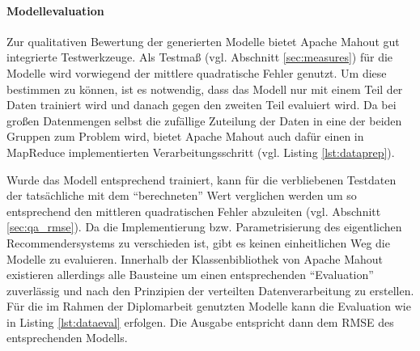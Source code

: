 \paragraph{Modellevaluation} Zur qualitativen Bewertung der generierten Modelle bietet Apache Mahout gut integrierte Testwerkzeuge. Als Testmaß (vgl. Abschnitt \ref{sec:measures}) für die Modelle wird vorwiegend der mittlere quadratische Fehler genutzt. Um diese bestimmen zu können, ist es notwendig, dass das Modell nur mit einem Teil der Daten trainiert wird und danach gegen den zweiten Teil evaluiert wird. Da bei großen Datenmengen selbst die zufällige Zuteilung der Daten in eine der beiden Gruppen zum Problem wird, bietet Apache Mahout auch dafür einen in MapReduce implementierten Verarbeitungsschritt (vgl. Listing \ref{lst:dataprep}).



Wurde das Modell entsprechend trainiert, kann für die verbliebenen Testdaten der tatsächliche mit dem ``berechneten'' Wert verglichen werden um so entsprechend den mittleren quadratischen Fehler abzuleiten (vgl. Abschnitt \ref{sec:qa_rmse}). Da die Implementierung bzw. Parametrisierung des eigentlichen Recommendersystems zu verschieden ist, gibt es keinen einheitlichen Weg die Modelle zu evaluieren. Innerhalb der Klassenbibliothek von Apache Mahout existieren allerdings alle Bausteine um einen entsprechenden ``Evaluation'' zuverlässig und nach den Prinzipien der verteilten Datenverarbeitung zu erstellen. Für die im Rahmen der Diplomarbeit genutzten Modelle kann die Evaluation wie in Listing \ref{lst:dataeval}  erfolgen. Die Ausgabe entspricht dann dem \acs{RMSE} des entsprechenden Modells. \citep{mia}

 

